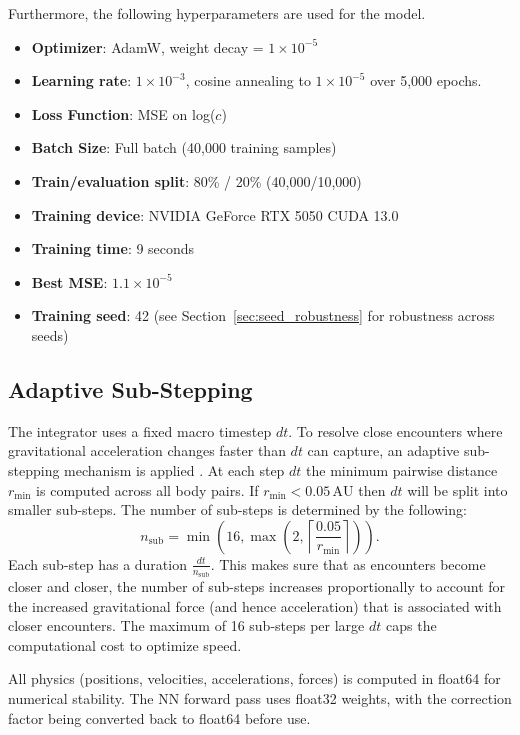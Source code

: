 \documentclass[12pt]{article}
\begin{document}
Furthermore, the following hyperparameters are used for the model.
\begin{itemize}
    \item \textbf{Optimizer}: AdamW, weight decay = $1\times10^{-5}$
    \item \textbf{Learning rate}: $1\times10^{-3}$, cosine annealing to $1\times10^{-5}$ \cite{loshchilov2017sgdr} over 5,000 epochs.
    \item \textbf{Loss Function}: MSE on log($c$)
    \item \textbf{Batch Size}: Full batch (40,000 training samples)
    \item \textbf{Train/evaluation split}: 80\% / 20\% (40,000/10,000)
    \item \textbf{Training device}: NVIDIA GeForce RTX 5050 CUDA 13.0
    \item \textbf{Training time}: 9 seconds
    \item \textbf{Best MSE}: $1.1 \times 10^{-5}$
    \item \textbf{Training seed}: 42 (see Section~\ref{sec:seed_robustness} for robustness across seeds)
\end{itemize}

\subsection{Adaptive Sub-Stepping}
\label{sec:adaptive}
The integrator uses a fixed macro timestep $dt$. To resolve close encounters where gravitational acceleration changes faster than $dt$ can capture, an adaptive sub-stepping mechanism is applied \cite{Rein_2014}. At each step $dt$ the minimum pairwise distance $r_{\min}$ is computed across all body pairs. If $r_{\min} <0.05\,\mathrm{AU}$ then $dt$ will be split into smaller sub-steps. The number of sub-steps is determined by the following:
\[
n_{\mathrm{sub}}=\min\left(16,\max\left(2,\left\lceil \frac{0.05}{r_{\min}}\right\rceil\right)\right).
\]
Each sub-step has a duration $\frac{dt}{n_{\mathrm{sub}}}$. This makes sure that as encounters become closer and closer, the number of sub-steps increases proportionally to account for the increased gravitational force (and hence acceleration) that is associated with closer encounters. The maximum of 16 sub-steps per large $dt$ caps the computational cost to optimize speed.

All physics (positions, velocities, accelerations, forces) is computed in float64 for numerical stability. The NN forward pass uses float32 weights, with the correction factor being converted back to float64 before use.
\end{document}
